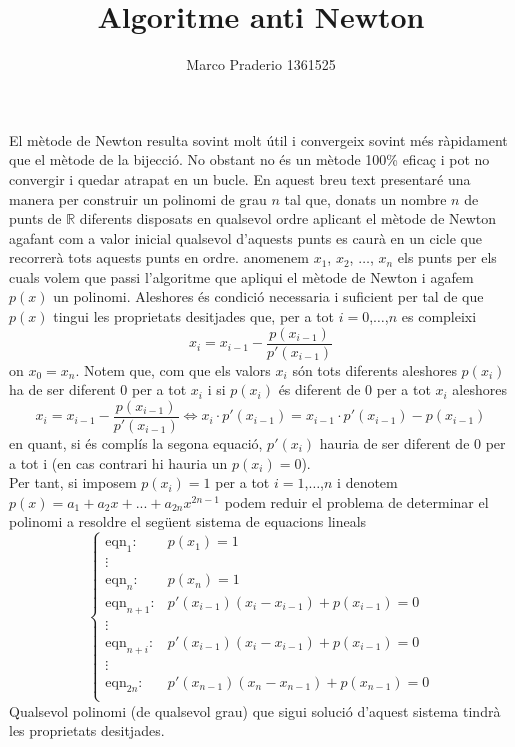 \documentclass[a4paper,10pt]{article}
\title{Algoritme anti Newton}
\author{Marco Praderio 1361525}
\date{}
\renewcommand{\*}{\cdot}
\newcommand{\R}{\mathbb{R}}
\begin{document}
\maketitle
El mètode de Newton resulta sovint molt útil i convergeix sovint més ràpidament que el mètode de la bijecció.
No obstant no és un mètode 100\% eficaç i pot no convergir i quedar atrapat en un bucle.
En aquest breu text presentaré una manera per construir un polinomi de grau $n$ tal que, donats un nombre $n$ de punts de $\R$ diferents disposats en qualsevol ordre
aplicant el mètode de Newton agafant com a valor inicial qualsevol d'aquests punts es caurà en un cicle que recorrerà tots aquests punts en ordre.
anomenem $x_1$, $x_2$, $\dots$, $x_n$ els punts per els cuals volem que passi l'algoritme que apliqui el mètode de Newton i agafem
$p(x)$ un polinomi.
Aleshores és condició necessaria i suficient per tal de que $p(x)$ tingui les proprietats desitjades que, per a tot $i=0$,$\dots$,$n$
es compleixi
\begin{equation*}
x_i=x_{i-1}-\frac{p(x_{i-1})}{p'(x_{i-1})}
\end{equation*}
on $x_0=x_n$.
Notem que, com que els valors $x_i$ són tots diferents aleshores $p(x_i)$ ha de ser diferent 0 per a tot $x_i$ i si $p(x_i)$ és diferent de 0 per a tot $x_i$ aleshores
\begin{equation*}
x_i=x_{i-1}-\frac{p(x_{i-1})}{p'(x_{i-1})} \Leftrightarrow x_i\*p'(x_{i-1})=x_{i-1}\*p'(x_{i-1})-p(x_{i-1})
\end{equation*}
en quant, si és complís la segona equació, $p'(x_i)$ hauria de ser diferent de 0 per a tot i (en cas contrari hi hauria un $p(x_i)=0$).\\
Per tant, si imposem $p(x_i)=1$ per a tot $i=1$,$\dots$,$n$ i denotem $p(x)=a_1+a_2x+...+a_{2n}x^{2n-1}$ podem reduir el problema de determinar el polinomi a resoldre
el següent sistema de equacions lineals
\begin{equation*}
\begin{cases}
\text{eqn}_1: & p(x_1)=1 \\
\vdots & \phantom{.}\\
\text{eqn}_n:	& p(x_n)=1\\
\text{eqn}_{n+1}: & p'(x_{i-1})(x_i-x_{i-1})+p(x_{i-1})=0\\
\vdots & \phantom{.}\\
\text{eqn}_{n+i}: & p'(x_{i-1})(x_i-x_{i-1})+p(x_{i-1})=0\\
\vdots & \phantom{.}\\
\text{eqn}_{2n}: & p'(x_{n-1})(x_n-x_{n-1})+p(x_{n-1})=0\\
\end{cases}
\end{equation*}
Qualsevol polinomi (de qualsevol grau) que sigui solució d'aquest sistema tindrà les proprietats desitjades.
\end{document}
